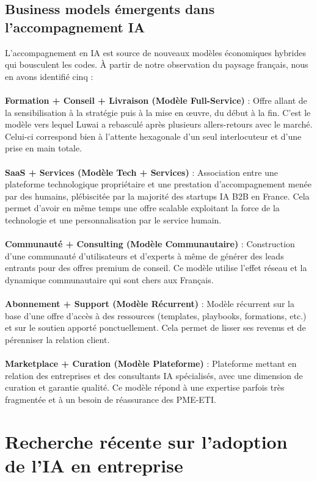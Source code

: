 \subsection{Business models émergents dans l'accompagnement IA}
L’accompagnement en IA est source de nouveaux modèles économiques hybrides qui bousculent les codes. À partir de notre observation du paysage français, nous en avons identifié cinq :
\\\\
\textbf{Formation + Conseil + Livraison (Modèle Full-Service)} : Offre allant de la sensibilisation à la stratégie puis à la mise en œuvre, du début à la fin. C’est le modèle vers lequel Luwai a rebasculé après plusieurs allers-retours avec le marché. Celui-ci correspond bien à l’attente hexagonale d’un seul interlocuteur et d’une prise en main totale.
\\\\
\textbf{SaaS + Services (Modèle Tech + Services)} : Association entre une plateforme technologique propriétaire et une prestation d’accompagnement menée par des humains, plébiscitée par la majorité des startups IA B2B en France. Cela permet d’avoir en même temps une offre scalable exploitant la force de la technologie et une personnalisation par le service humain.
\\\\
\textbf{Communauté + Consulting (Modèle Communautaire)} : Construction d’une communauté d’utilisateurs et d’experts à même de générer des leads entrants pour des offres premium de conseil. Ce modèle utilise l’effet réseau et la dynamique communautaire qui sont chers aux Français.
\\\\
\textbf{Abonnement + Support (Modèle Récurrent)} : Modèle récurrent sur la base d’une offre d’accès à des ressources (templates, playbooks, formations, etc.) et sur le soutien apporté ponctuellement. Cela permet de lisser ses revenus et de pérenniser la relation client.
\\\\
\textbf{Marketplace + Curation (Modèle Plateforme)} : Plateforme mettant en relation des entreprises et des consultants IA spécialisés, avec une dimension de curation et garantie qualité. Ce modèle répond à une expertise parfois très fragmentée et à un besoin de réassurance des PME-ETI.
\section{Recherche récente sur l'adoption de l'IA en entreprise}

